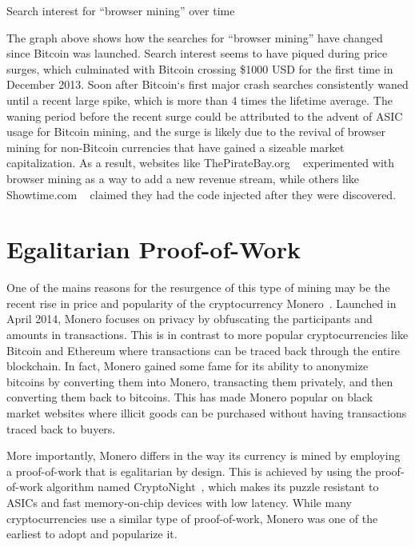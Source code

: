\begin{center}
	\caption{Search interest for ``browser mining'' over time}
\end{center}

The graph above shows how the searches for ``browser mining'' have changed since Bitcoin was launched. Search interest seems to have piqued during price surges, which culminated with Bitcoin crossing \$1000 USD for the first time in December 2013. Soon after Bitcoin`s first major crash searches consistently waned until a recent large spike, which is more than 4 times the lifetime average. The waning period before the recent surge could be attributed to the advent of ASIC usage for Bitcoin mining, and the surge is likely due to the revival of browser mining for non-Bitcoin currencies that have gained a sizeable market capitalization. As a result, websites like ThePirateBay.org ~\cite{piratesbayhive} experimented with browser mining as a way to add a new revenue stream, while others like Showtime.com ~\cite{showtimehive} claimed they had the code injected after they were discovered.

\section{Egalitarian Proof-of-Work}
One of the mains reasons for the resurgence of this type of mining may be the recent rise in price and popularity of the cryptocurrency Monero~\cite{monero}. Launched in April 2014, Monero focuses on privacy by obfuscating the participants and amounts in transactions. This is in contrast to more popular cryptocurrencies like Bitcoin and Ethereum where transactions can be traced back through the entire blockchain. In fact, Monero gained some fame for its ability to anonymize bitcoins by converting them into Monero, transacting them privately, and then converting them back to bitcoins. This has made Monero popular on black market websites where illicit goods can be purchased without having transactions traced back to buyers. 


More importantly, Monero differs in the way its currency is mined by employing a proof-of-work that is egalitarian by design. This is achieved by using the proof-of-work algorithm named CryptoNight~\cite{cryptoknight}, which makes its puzzle resistant to ASICs and fast memory-on-chip devices with low latency. While many cryptocurrencies use a similar type of proof-of-work, Monero was one of the earliest to adopt and popularize it. 


